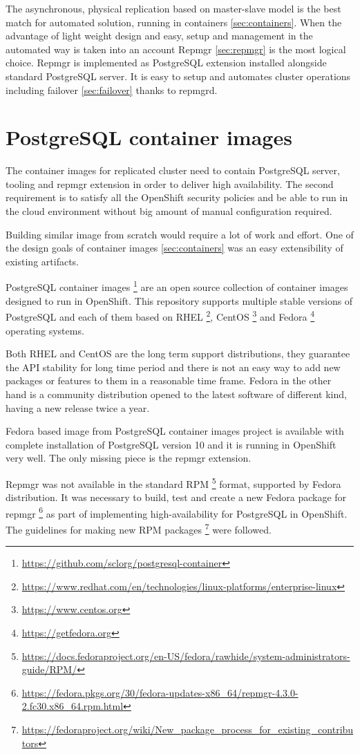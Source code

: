 \documentclass[
  digital, %
  twoside, %
  table,   %
  lof,     %
  lot,     %
]{fithesis3}
\begin{document}
The asynchronous, physical replication based on master-slave model is the best match for automated solution, running in containers \ref{sec:containers}. When the advantage of light weight design and easy, setup and management in the automated way is taken into an account Repmgr \ref{sec:repmgr} is the most logical choice. Repmgr is implemented as PostgreSQL extension installed alongside standard PostgreSQL server. It is easy to setup and automates cluster operations including failover \ref{sec:failover} thanks to repmgrd.

\section{PostgreSQL container images}
The container images for replicated cluster need to contain PostgreSQL server, tooling and repmgr extension in order to deliver high availability. The second requirement is to satisfy all the OpenShift security policies and be able to run in the cloud environment without big amount of manual configuration required.

Building similar image from scratch would require a lot of work and effort. One of the design goals of container images \ref{sec:containers} was an easy extensibility of existing artifacts.

PostgreSQL container images \footnote{\url{https://github.com/sclorg/postgresql-container}} are an open source collection of container images designed to run in OpenShift. This repository supports multiple stable versions of PostgreSQL and each of them based on RHEL \footnote{\url{https://www.redhat.com/en/technologies/linux-platforms/enterprise-linux}}, CentOS \footnote{\url{https://www.centos.org}} and Fedora \footnote{\url{https://getfedora.org}} operating systems.

Both RHEL and CentOS are the long term support distributions, they guarantee the API stability for long time period and there is not an easy way to add new packages or features to them in a reasonable time frame. Fedora in the other hand is a community distribution opened to the latest software of different kind, having a new release twice a year.

Fedora based image from PostgreSQL container images project is available with complete installation of PostgreSQL version 10 and it is running in OpenShift very well. The only missing piece is the repmgr extension.

Repmgr was not available in the standard RPM \footnote{\url{https://docs.fedoraproject.org/en-US/fedora/rawhide/system-administrators-guide/RPM/}} format, supported by Fedora distribution. It was necessary to build, test and create a new Fedora package for repmgr \footnote{\url{https://fedora.pkgs.org/30/fedora-updates-x86_64/repmgr-4.3.0-2.fc30.x86_64.rpm.html}} as part of implementing high-availability for PostgreSQL in OpenShift. The guidelines for making new RPM packages \footnote{\url{https://fedoraproject.org/wiki/New_package_process_for_existing_contributors}} were followed.
\end{document}
